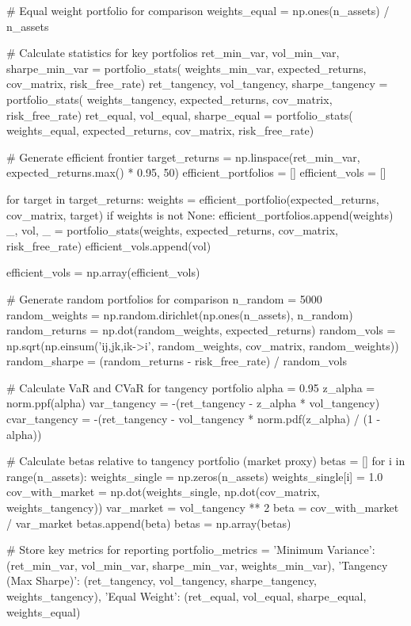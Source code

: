 \documentclass[a4paper, 11pt]{article}
\begin{document}
\begin{pycode}
# Equal weight portfolio for comparison
weights_equal = np.ones(n_assets) / n_assets

# Calculate statistics for key portfolios
ret_min_var, vol_min_var, sharpe_min_var = portfolio_stats(
    weights_min_var, expected_returns, cov_matrix, risk_free_rate)
ret_tangency, vol_tangency, sharpe_tangency = portfolio_stats(
    weights_tangency, expected_returns, cov_matrix, risk_free_rate)
ret_equal, vol_equal, sharpe_equal = portfolio_stats(
    weights_equal, expected_returns, cov_matrix, risk_free_rate)

# Generate efficient frontier
target_returns = np.linspace(ret_min_var, expected_returns.max() * 0.95, 50)
efficient_portfolios = []
efficient_vols = []

for target in target_returns:
    weights = efficient_portfolio(expected_returns, cov_matrix, target)
    if weights is not None:
        efficient_portfolios.append(weights)
        _, vol, _ = portfolio_stats(weights, expected_returns, cov_matrix, risk_free_rate)
        efficient_vols.append(vol)

efficient_vols = np.array(efficient_vols)

# Generate random portfolios for comparison
n_random = 5000
random_weights = np.random.dirichlet(np.ones(n_assets), n_random)
random_returns = np.dot(random_weights, expected_returns)
random_vols = np.sqrt(np.einsum('ij,jk,ik->i', random_weights, cov_matrix, random_weights))
random_sharpe = (random_returns - risk_free_rate) / random_vols

# Calculate VaR and CVaR for tangency portfolio
alpha = 0.95
z_alpha = norm.ppf(alpha)
var_tangency = -(ret_tangency - z_alpha * vol_tangency)
cvar_tangency = -(ret_tangency - vol_tangency * norm.pdf(z_alpha) / (1 - alpha))

# Calculate betas relative to tangency portfolio (market proxy)
betas = []
for i in range(n_assets):
    weights_single = np.zeros(n_assets)
    weights_single[i] = 1.0
    cov_with_market = np.dot(weights_single, np.dot(cov_matrix, weights_tangency))
    var_market = vol_tangency ** 2
    beta = cov_with_market / var_market
    betas.append(beta)
betas = np.array(betas)

# Store key metrics for reporting
portfolio_metrics = {
    'Minimum Variance': (ret_min_var, vol_min_var, sharpe_min_var, weights_min_var),
    'Tangency (Max Sharpe)': (ret_tangency, vol_tangency, sharpe_tangency, weights_tangency),
    'Equal Weight': (ret_equal, vol_equal, sharpe_equal, weights_equal)
}
\end{pycode}
\end{document}
